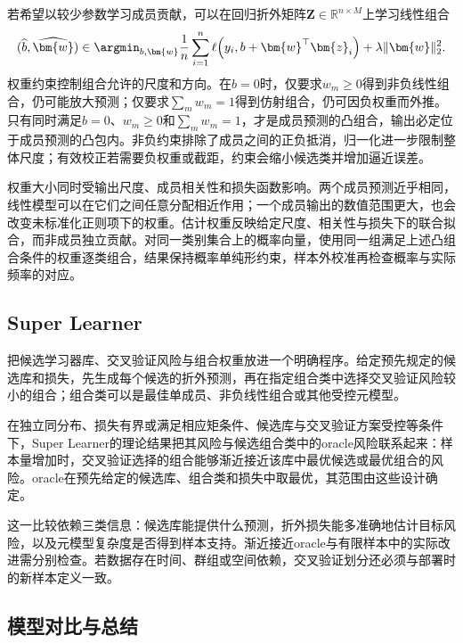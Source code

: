 若希望以较少参数学习成员贡献，可以在回归折外矩阵$\bm{Z}\in\mathbb{R}^{n\times M}$上学习线性组合
\begin{equation}
  (\widehat{b},\widehat{\bm{w}})
  \in
  \argmin_{b,\bm{w}}
  \frac{1}{n}
  \sum_{i=1}^{n}
  \ell\!\left(
    y_i,
    b+\bm{w}^{\top}\bm{z}_i
  \right)
  +\lambda\lVert\bm{w}\rVert_2^2.
  \label{eq:ensemble-linear-stacking}
\end{equation}
权重约束控制组合允许的尺度和方向。在$b=0$时，仅要求$w_m\geq0$得到非负线性组合，仍可能放大预测；仅要求$\sum_mw_m=1$得到仿射组合，仍可因负权重而外推。只有同时满足$b=0$、$w_m\geq0$和$\sum_mw_m=1$，才是成员预测的凸组合，输出必定位于成员预测的凸包内。非负约束排除了成员之间的正负抵消，归一化进一步限制整体尺度；有效校正若需要负权重或截距，约束会缩小候选类并增加逼近误差。

权重大小同时受输出尺度、成员相关性和损失函数影响。两个成员预测近乎相同，线性模型可以在它们之间任意分配相近作用；一个成员输出的数值范围更大，也会改变未标准化正则项下的权重。估计权重反映给定尺度、相关性与损失下的联合拟合，而非成员独立贡献。对同一类别集合上的概率向量，使用同一组满足上述凸组合条件的权重逐类组合，结果保持概率单纯形约束，样本外校准再检查概率与实际频率的对应。

\subsection{Super Learner}
\label{sec:ensemble-super-learner}

把候选学习器库、交叉验证风险与组合权重放进一个明确程序。给定预先规定的候选库和损失，先生成每个候选的折外预测，再在指定组合类中选择交叉验证风险较小的组合；组合类可以是最佳单成员、非负线性组合或其他受控元模型。

在独立同分布、损失有界或满足相应矩条件、候选库与交叉验证方案受控等条件下，Super Learner的理论结果把其风险与候选组合类中的oracle风险联系起来：样本量增加时，交叉验证选择的组合能够渐近接近该库中最优候选或最优组合的风险。oracle在预先给定的候选库、组合类和损失中取最优，其范围由这些设计确定。

这一比较依赖三类信息：候选库能提供什么预测，折外损失能多准确地估计目标风险，以及元模型复杂度是否得到样本支持。渐近接近oracle与有限样本中的实际改进需分别检查。若数据存在时间、群组或空间依赖，交叉验证划分还必须与部署时的新样本定义一致。

\subsection{模型对比与总结}
\label{sec:ensemble-stacking-comparison}

